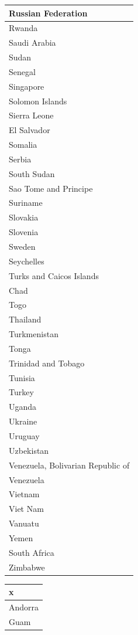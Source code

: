 \documentclass[]{article}
\begin{document}
\begin{table}
\begin{tabular}[t]{l}
\hline
Russian Federation\\
\hline
Rwanda\\
\hline
Saudi Arabia\\
\hline
Sudan\\
\hline
Senegal\\
\hline
Singapore\\
\hline
Solomon Islands\\
\hline
Sierra Leone\\
\hline
El Salvador\\
\hline
Somalia\\
\hline
Serbia\\
\hline
South Sudan\\
\hline
Sao Tome and Principe\\
\hline
Suriname\\
\hline
Slovakia\\
\hline
Slovenia\\
\hline
Sweden\\
\hline
Seychelles\\
\hline
Turks and Caicos Islands\\
\hline
Chad\\
\hline
Togo\\
\hline
Thailand\\
\hline
Turkmenistan\\
\hline
Tonga\\
\hline
Trinidad and Tobago\\
\hline
Tunisia\\
\hline
Turkey\\
\hline
Uganda\\
\hline
Ukraine\\
\hline
Uruguay\\
\hline
Uzbekistan\\
\hline
Venezuela, Bolivarian Republic of\\
\hline
Venezuela\\
\hline
Vietnam\\
\hline
Viet Nam\\
\hline
Vanuatu\\
\hline
Yemen\\
\hline
South Africa\\
\hline
Zimbabwe\\
\hline
\end{tabular}
\centering
\begin{tabular}[t]{l}
\hline
x\\
\hline
Andorra\\
\hline
Guam\\

\end{tabular}
\end{table}
\end{document}
